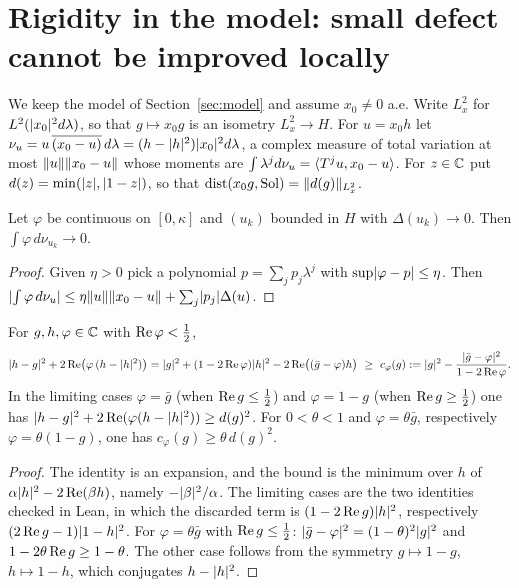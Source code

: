 \section{Rigidity in the model: small defect cannot be improved locally}\label{sec:rigidity}

We keep the model of Section~\ref{sec:model} and assume $x_0\ne0$ a.e. Write $L^2_x$ for
$L^2(\lvert x_0\rvert^2d\lambda)$, so that $g\mapsto x_0g$ is an isometry $L^2_x\to H$. For $u=x_0h$ let
$\nu_u=u\,\overline{(x_0-u)}\,d\lambda=(h-\lvert h\rvert^2)\lvert x_0\rvert^2d\lambda$, a complex measure of
total variation at most $\lVert u\rVert\lVert x_0-u\rVert$ whose moments are
$\int\lambda^jd\nu_u=\langle T^ju,x_0-u\rangle$. For $z\in\mathbb{C}$ put $d(z)=\min(\lvert z\rvert,\lvert 1-z\rvert)$, so that
$\operatorname{dist}(x_0g,\operatorname{Sol})=\lVert d(g)\rVert_{L^2_x}$.

\begin{lemma}\label{lem:testing}\stproved{}
Let $\varphi$ be continuous on $[0,\kappa]$ and $(u_k)$ bounded in $H$ with $\Delta(u_k)\to0$.
Then $\int\varphi\,d\nu_{u_k}\to0$.
\end{lemma}
\begin{proof}
Given $\eta>0$ pick a polynomial $p=\sum_jp_j\lambda^j$ with $\sup\lvert \varphi-p\rvert\le\eta$. Then
$\lvert \int\varphi\,d\nu_u\rvert\le\eta\lVert u\rVert\lVert x_0-u\rVert+\sum_j\lvert p_j\rvert\Delta(u)$.
\end{proof}

\begin{lemma}\label{lem:pointwise}
\stproved{} 
For $g,h,\varphi\in\mathbb{C}$ with $\operatorname{Re}\varphi<\frac12$,
\[
\lvert h-g\rvert^2+2\operatorname{Re}\bigl(\varphi\,(h-\lvert h\rvert^2)\bigr)
=\lvert g\rvert^2+(1-2\operatorname{Re}\varphi)\lvert h\rvert^2-2\operatorname{Re}\bigl((\bar g-\varphi)h\bigr)
\ \ge\ c_\varphi(g):=\lvert g\rvert^2-\frac{\lvert \bar g-\varphi\rvert^2}{1-2\operatorname{Re}\varphi}.
\]
In the limiting cases $\varphi=\bar g$ (when $\operatorname{Re} g\le\frac12$) and $\varphi=1-g$ (when
$\operatorname{Re} g\ge\frac12$) one has
$\lvert h-g\rvert^2+2\operatorname{Re}(\varphi(h-\lvert h\rvert^2))\ge d(g)^2$. For $0<\theta<1$ and
$\varphi=\theta\bar g$, respectively $\varphi=\theta(1-g)$, one has $c_\varphi(g)\ge\theta\,d(g)^2$.
\end{lemma}
\begin{proof}
The identity is an expansion, and the bound is the minimum over $h$ of
$\alpha\lvert h\rvert^2-2\operatorname{Re}(\beta h)$, namely $-\lvert \beta\rvert^2/\alpha$. The limiting cases are the two
identities checked in Lean, in which the discarded term is $(1-2\operatorname{Re} g)\lvert h\rvert^2$, respectively
$(2\operatorname{Re} g-1)\lvert 1-h\rvert^2$. For $\varphi=\theta\bar g$ with $\operatorname{Re} g\le\frac12$:
$\lvert \bar g-\varphi\rvert^2=(1-\theta)^2\lvert g\rvert^2$ and $1-2\theta\operatorname{Re} g\ge1-\theta$. The other case
follows from the symmetry $g\mapsto1-g$, $h\mapsto1-h$, which conjugates $h-\lvert h\rvert^2$.
\end{proof}

